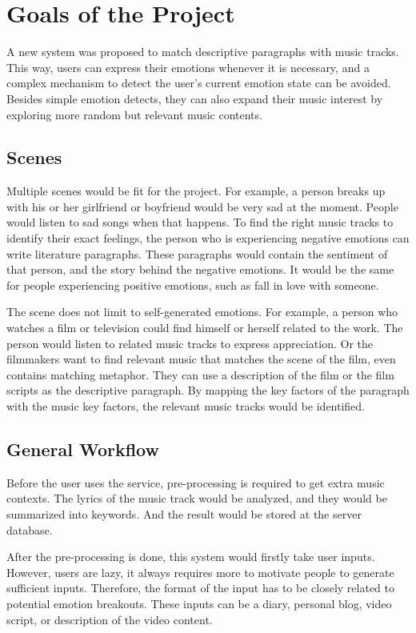 \section{Goals of the Project}
\label{sec:goals}

A new system was proposed to match descriptive paragraphs with music tracks. This way, users can express their emotions whenever it is necessary, and a complex mechanism to detect the user's current emotion state can be avoided. Besides simple emotion detects, they can also expand their music interest by exploring more random but relevant music contents.

\subsection{Scenes}

Multiple scenes would be fit for the project. For example, a person breaks up with his or her girlfriend or boyfriend would be very sad at the moment. People would listen to sad songs when that happens. To find the right music tracks to identify their exact feelings, the person who is experiencing negative emotions can write literature paragraphs. These paragraphs would contain the sentiment of that person, and the story behind the negative emotions. It would be the same for people experiencing positive emotions, such as fall in love with someone.

The scene does not limit to self-generated emotions. For example, a person who watches a film or television could find himself or herself related to the work. The person would listen to related music tracks to express appreciation. Or the filmmakers want to find relevant music that matches the scene of the film, even contains matching metaphor. They can use a description of the film or the film scripts as the descriptive paragraph. By mapping the key factors of the paragraph with the music key factors, the relevant music tracks would be identified.

\subsection{General Workflow}

Before the user uses the service, pre-processing is required to get extra music contexts. The lyrics of the music track would be analyzed, and they would be summarized into keywords. And the result would be stored at the server database.

After the pre-processing is done, this system would firstly take user inputs. However, users are lazy, it always requires more to motivate people to generate sufficient inputs. Therefore, the format of the input has to be closely related to potential emotion breakouts. These inputs can be a diary, personal blog, video script, or description of the video content.

